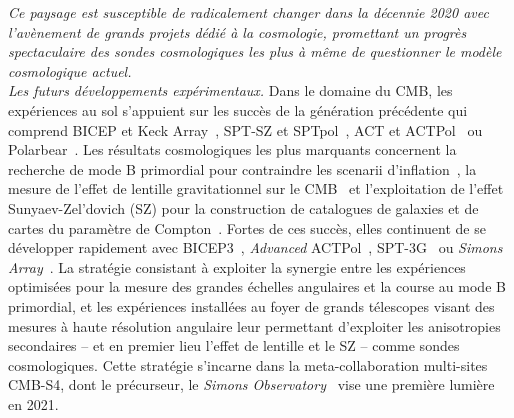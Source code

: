 \emph{Ce paysage est susceptible de radicalement changer dans la décennie
2020 avec l'avènement de grands projets dédié à la cosmologie,
promettant un progrès spectaculaire des sondes cosmologiques les plus
à même de questionner le modèle cosmologique actuel.} \\

\emph{Les futurs développements expérimentaux.}
Dans le domaine du CMB, les expériences au sol s'appuient sur les
succès de la génération précédente qui comprend BICEP et Keck
Array~\citep{BK2018}, SPT-SZ et SPTpol~\citep{deHaan2016, SPTpol2019},
ACT et ACTPol~\citep{Swetz2011_ACT, ACTpol2017} ou
Polarbear~\citep{Polarbear2017}. Les résultats cosmologiques les plus
marquants concernent la recherche de mode B primordial pour contraindre les scenarii
d'inflation~\citep{BKP2015, BK2016}, la mesure de l'effet de lentille
gravitationnel sur le CMB~\citep[\emph{e.g.}][]{ACT2011_lensing, POLARBEAR2019_lensing,
SPTpol2019_lensing, SPTpol2019_clusterlensing} et l'exploitation de l'effet
Sunyaev-Zel'dovich (SZ) pour la construction de catalogues de galaxies
et de cartes du paramètre de Compton~\citep[\emph{e.g.}][]{Hasselfield2013_ACT_SZ, Dunkley2013, ACTpol2018_SZ, Reichardt2013_SPT_SZ,
George2015, Bleem2015, deHaan2016, Bleem2019, Bocquet2019}. Fortes de ces succès, elles
continuent de se développer rapidement
avec BICEP3~\citep{BICEP3_2018}, \emph{Advanced} ACTPol~\citep{AdvACT2018},
SPT-3G~\citep{SPT3G_2018} ou \emph{Simons Array}~\citep{SA_2016}.
La stratégie consistant à exploiter la synergie
entre les expériences optimisées pour la mesure des grandes échelles
angulaires et la course au mode B primordial, et les expériences
installées au foyer de grands télescopes visant des mesures à haute
résolution angulaire leur permettant d'exploiter les anisotropies
secondaires -- et en premier lieu l'effet de lentille et le SZ --
comme sondes cosmologiques. Cette stratégie s'incarne dans la
meta-collaboration multi-sites CMB-S4, dont le précurseur,
le \emph{Simons Observatory}~\citep{SO2019} vise une première lumière
en 2021.


